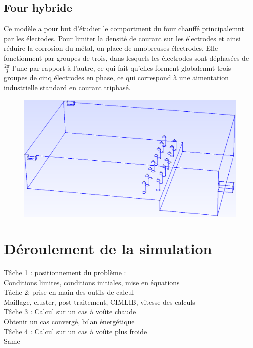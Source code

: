 \documentclass[12pt, a4paper, french, BCOR = 0pt, DIV = 10]{scrartcl}
\begin{document}
    \subsection{Four hybride}
    Ce modèle a pour but d'étudier le comportment du four chauffé principalemnt par les électodes. Pour limiter la densité de courant sur les électrodes et ainsi réduire la corrosion du métal, on place de nmobreuses électrodes. Elle fonctionnent par groupes de trois, dans lesquels les électrodes sont déphasées de $\frac{2\pi}{3}$ l'une par rapport à l'autre, ce qui fait qu'elles forment globalemnt trois groupes de cinq électrodes en phase, ce qui correspond à une aimentation industrielle standard en courant triphasé.

    \begin{center}
        \begin{figure}[H]
            \includegraphics[width=0.7\linewidth]{Four5Elec.png}
        \end{figure}
    \end{center}




    \section{Déroulement de la simulation}
    Tâche 1 : positionnement du problème : \\
    Conditions limites, conditions initiales, mise en équations \\


    Tâche 2: prise en main des outils de calcul\\
    Maillage, cluster, post-traitement, CIMLIB, vitesse des calculs \\

    
    Tâche 3 : Calcul sur un cas à voûte chaude\\ 
    Obtenir un cas convergé, bilan énergétique \\

    
    Tâche 4 : Calcul sur un cas à voûte plus froide \\ 
    Same\\
\end{document}
